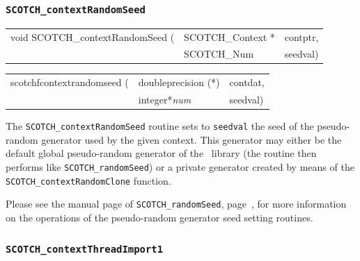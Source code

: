 \subsubsection{\texttt{SCOTCH\_contextRandomSeed}}

\begin{itemize}
\progsyn

{\tt\begin{tabular}{l@{}ll}
void SCOTCH\_contextRandomSeed ( & SCOTCH\_Context * & contptr, \\
                                 & SCOTCH\_Num       & seedval)
\end{tabular}}

{\tt\begin{tabular}{l@{}ll}
scotchfcontextrandomseed ( & doubleprecision (*) & contdat, \\
                           & integer*{\it num}   & seedval)
\end{tabular}}

\progdes

The {\tt SCOTCH\_contextRandomSeed} routine sets to \texttt{seedval}
the seed of the pseudo-random generator used by the given
context. This generator may either be the default global pseudo-random
generator of the \libscotch\ library (the routine then performs like
\texttt{SCOTCH\_\lbt random\lbt Seed}) or a private generator created
by means of the \texttt{SCOTCH\_\lbt context\lbt Random\lbt Clone}
function.

Please see the manual page of \texttt{SCOTCH\_\lbt random\lbt Seed},
page~\pageref{sec-lib-random-seed}, for more information on the
operations of the pseudo-random generator seed setting routines.
\end{itemize}

\subsubsection{\texttt{SCOTCH\_contextThreadImport1}}

